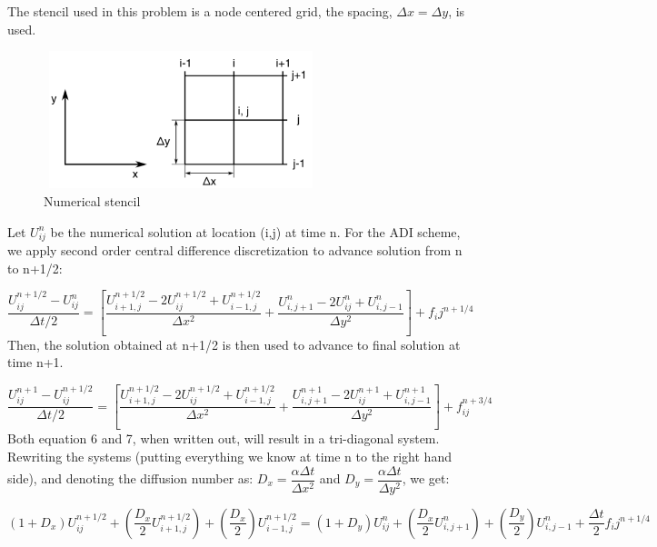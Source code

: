 \documentclass[12pt]{article}
\begin{document}
	
	The stencil used in this problem is a node centered grid, the spacing, $\Delta x = \Delta y$, is used.	
	
	\begin{figure}[H]
		\hfill\includegraphics[width=80mm,height= 40mm]{stencil.png}\hspace*{\fill}
		\caption{Numerical stencil}
	\end{figure}
	\noindent
	Let $U_{ij}^n$ be the numerical solution at location (i,j) at time n. For the ADI scheme, we apply second order central difference discretization to advance solution from n to n+1/2:
	
	\begin{equation}
		\dfrac{U_{ij}^{n+1/2}-U_{ij}^{n}}{\Delta t/2} = \left[ \dfrac{U_{i+1,j}^{n+1/2}-2U_{ij}^{n+1/2} + U_{i-1,j}^{n+1/2}}{\Delta x^2}      +    \dfrac{U_{i,j+1}^{n}-2U_{ij}^{n} + U_{i,j-1}^{n}}{\Delta y^2}                 \right] + f_ij^{n+1/4}
	\end{equation}
	Then, the solution obtained at n+1/2 is then used to advance to final solution at time n+1. 
	
	\begin{equation}
		\dfrac{U_{ij}^{n+1}-U_{ij}^{n+1/2}}{\Delta t/2} = \left[ \dfrac{U_{i+1,j}^{n+1/2}-2U_{ij}^{n+1/2} + U_{i-1,j}^{n+1/2}}{\Delta x^2}      +    \dfrac{U_{i,j+1}^{n+1}-2U_{ij}^{n+1} + U_{i,j-1}^{n+1}}{\Delta y^2}                 \right] + f_{ij}^{n+3/4}
	\end{equation}
	Both equation 6 and 7, when written out, will result in a tri-diagonal system. Rewriting the systems (putting everything we know at time n to the right hand side), and denoting the diffusion number as: $D_x = \dfrac{\alpha\Delta t}{\Delta x^2}$ and $D_y = \dfrac{\alpha\Delta t}{\Delta y^2}$, we get: 
	
	\begin{equation}
		(1+D_x)U_{ij}^{n+1/2} + \left(\dfrac{D_x}{2}U_{i+1,j}^{n+1/2}\right) +\left(\dfrac{D_x}{2}\right)U_{i-1,j}^{n+1/2} =  (1+D_y)U_{ij}^{n} + \left(\dfrac{D_x}{2}U_{i,j+1}^{n}\right) +\left(\dfrac{D_y}{2}\right)U_{i,j-1}^{n}+\dfrac{\Delta t}{2}f_ij^{n+1/4}  
	\end{equation}
	
\end{document}
